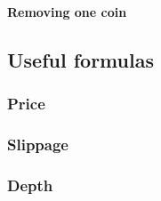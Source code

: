 \documentclass[
]{article}
\begin{document}
\hypertarget{removing-one-coin}{%
\paragraph{Removing one coin}\label{removing-one-coin}}

\hypertarget{useful-formulas}{%
\subsection{Useful formulas}\label{useful-formulas}}

\hypertarget{price}{%
\subsubsection{Price}\label{price}}

\hypertarget{slippage}{%
\subsubsection{Slippage}\label{slippage}}

\hypertarget{depth}{%
\subsubsection{Depth}\label{depth}}
\end{document}
